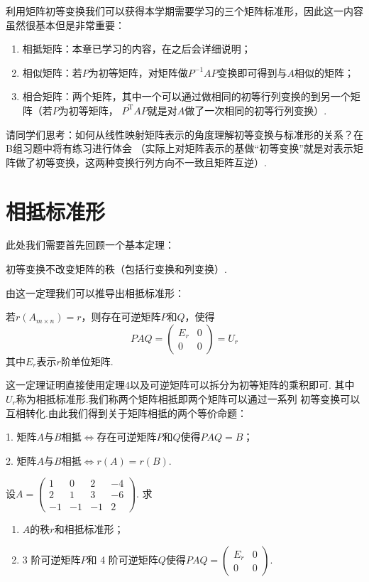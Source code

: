 利用矩阵初等变换我们可以获得本学期需要学习的三个矩阵标准形，因此这一内容虽然很基本但是非常重要：
\begin{enumerate}
    \item 相抵矩阵：本章已学习的内容，在之后会详细说明；
    \item 相似矩阵：若$P$为初等矩阵，对矩阵做$P^{-1}AP$变换即可得到与$A$相似的矩阵；
    \item 相合矩阵：两个矩阵，其中一个可以通过做相同的初等行列变换的到另一个矩阵（若$P$为初等矩阵，
    $P^{\mathrm{T}}AP$就是对$A$做了一次相同的初等行列变换）.
\end{enumerate}
请同学们思考：如何从线性映射矩阵表示的角度理解初等变换与标准形的关系？在B组习题中将有练习进行体会
（实际上对矩阵表示的基做``初等变换''就是对表示矩阵做了初等变换，这两种变换行列方向不一致且矩阵互逆）.


\section{相抵标准形}
此处我们需要首先回顾一个基本定理：
\begin{theorem}
    初等变换不改变矩阵的秩（包括行变换和列变换）.
\end{theorem}
由这一定理我们可以推导出相抵标准形：
\begin{theorem}
    若$r(A_{m \times n})=r$，则存在可逆矩阵$P$和$Q$，使得
    \[PAQ=\begin{pmatrix}
        E_r & 0 \\ 0 & 0
    \end{pmatrix}=U_r\]
    其中$E_r$表示$r$阶单位矩阵.
\end{theorem}
这一定理证明直接使用定理4以及可逆矩阵可以拆分为初等矩阵的乘积即可.
其中$U_r$称为相抵标准形.我们称两个矩阵相抵即两个矩阵可以通过一系列
初等变换可以互相转化.由此我们得到关于矩阵相抵的两个等价命题：

1. 矩阵$A$与$B$相抵$\iff$存在可逆矩阵$P$和$Q$使得$PAQ=B$；

2. 矩阵$A$与$B$相抵$\iff r(A)=r(B)$.

\begin{example}
    设$A=\begin{pmatrix}
        1 & 0 & 2 & -4 \\ 2 & 1 & 3 & -6 \\ -1 & -1 & -1 & 2
    \end{pmatrix}$. 求
    \begin{enumerate}
        \item $A$的秩$r$和相抵标准形；

        \item 3 阶可逆矩阵$P$和 4 阶可逆矩阵$Q$使得$PAQ=\begin{pmatrix}
            E_r & 0 \\ 0 & 0
        \end{pmatrix}$.
    \end{enumerate}
\end{example}

